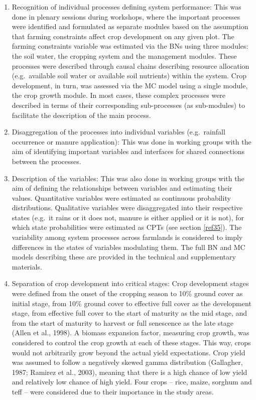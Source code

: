 \documentclass[]{elsarticle} %
\begin{document}
\begin{enumerate}
\def\labelenumi{\arabic{enumi}.}
\item
  Recognition of individual processes defining system performance: This was done in plenary sessions during workshops, where the important processes were identified and formulated as separate modules based on the assumption that farming constraints affect crop development on any given plot. The farming constraints variable was estimated via the BNs using three modules: the soil water, the cropping system and the management modules. These processes were described through causal chains describing resource allocation (e.g.~available soil water or available soil nutrients) within the system. Crop development, in turn, was assessed via the MC model using a single module, the crop growth module. In most cases, these complex processes were described in terms of their corresponding sub-processes (as sub-modules) to facilitate the description of the main process.
\item
  Disaggregation of the processes into individual variables (e.g.~rainfall occurrence or manure application): This was done in working groups with the aim of identifying important variables and interfaces for shared connections between the processes.
\item
  Description of the variables: This was also done in working groups with the aim of defining the relationships between variables and estimating their values. Quantitative variables were estimated as continuous probability distributions. Qualitative variables were disaggregated into their respective states (e.g.~it rains or it does not, manure is either applied or it is not), for which state probabilities were estimated as CPTs (see section \ref{ref35}). The variability among system processes across farmlands is considered to imply differences in the states of variables modulating them. The full BN and MC models describing these are provided in the technical and supplementary materials.
\item
  Separation of crop development into critical stages: Crop development stages were defined from the onset of the cropping season to 10\% ground cover as initial stage, from 10\% ground cover to effective full cover as the development stage, from effective full cover to the start of maturity as the mid stage, and from the start of maturity to harvest or full senescence as the late stage (Allen et al., 1998). A biomass expansion factor, measuring crop growth, was considered to control the crop growth at each of these stages. This way, crops would not arbitrarily grow beyond the actual yield expectations. Crop yield was assumed to follow a negatively skewed gamma distribution (Gallagher, 1987; Ramirez et al., 2003), meaning that there is a high chance of low yield and relatively low chance of high yield. Four crops -- rice, maize, sorghum and teff -- were considered due to their importance in the study areas.
\end{enumerate}
\end{document}
